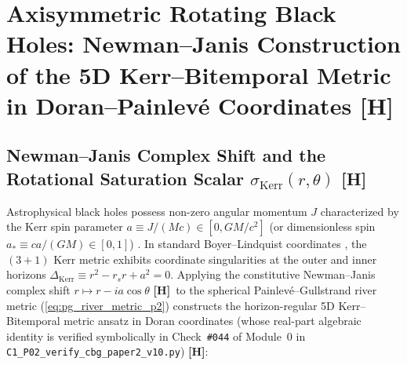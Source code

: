 \documentclass[11pt,a4paper]{article}
\newcommand{\catH}{\textbf{\textcolor{orange!85!black}{[H]}}}
\theoremstyle{plain}
\theoremstyle{definition}
\theoremstyle{remark}
\numberwithin{equation}{section}
\begin{document}
\section{\texorpdfstring{Axisymmetric Rotating Black Holes: Newman--Janis Construction of the 5D Kerr--Bitemporal Metric in Doran--Painlev\'e Coordinates \catH}{Axisymmetric Rotating Black Holes: Newman-Janis Construction of the 5D Kerr-Bitemporal Metric in Doran-Painleve Coordinates}}

\subsection{\texorpdfstring{Newman--Janis Complex Shift and the Rotational Saturation Scalar $\sigma_{\text{Kerr}}(r,\theta)$ \catH}{Newman-Janis Complex Shift and the Rotational Saturation Scalar}}

Astrophysical black holes possess non-zero angular momentum $J$ characterized by the Kerr spin parameter $a \equiv J / (Mc) \in [0, GM/c^2]$ (or dimensionless spin $a_* \equiv c a / (GM) \in [0, 1]$) \cite{kerr1963}. In standard Boyer--Lindquist coordinates \cite{boyer1967}, the $(3+1)$ Kerr metric exhibits coordinate singularities at the outer and inner horizons $\Delta_{\text{Kerr}} \equiv r^2 - r_s r + a^2 = 0$. Applying the constitutive Newman--Janis complex shift $r \mapsto r - i a\cos\theta$ \catH\ to the spherical Painlev\'e--Gullstrand river metric (\ref{eq:pg_river_metric_p2}) constructs the horizon-regular 5D Kerr--Bitemporal metric ansatz in Doran coordinates \cite{doran2000,hamilton2008} (whose real-part algebraic identity is verified symbolically in Check~\texttt{\#044} of Module~0 in \allowbreak\texttt{C1\_P02\_verify\_cbg\_paper2\_v10.py}) \catH:
\end{document}
